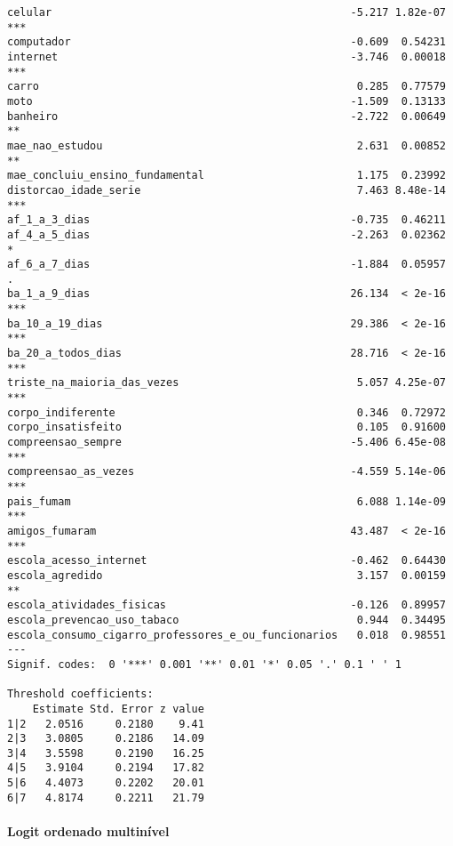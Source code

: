 \documentclass[
]{article}
\let\oldparagraph\paragraph
\renewcommand{\paragraph}[1]{\oldparagraph{#1}\mbox{}}
\begin{document}
\begin{verbatim}
celular                                               -5.217 1.82e-07 ***
computador                                            -0.609  0.54231    
internet                                              -3.746  0.00018 ***
carro                                                  0.285  0.77579    
moto                                                  -1.509  0.13133    
banheiro                                              -2.722  0.00649 ** 
mae_nao_estudou                                        2.631  0.00852 ** 
mae_concluiu_ensino_fundamental                        1.175  0.23992    
distorcao_idade_serie                                  7.463 8.48e-14 ***
af_1_a_3_dias                                         -0.735  0.46211    
af_4_a_5_dias                                         -2.263  0.02362 *  
af_6_a_7_dias                                         -1.884  0.05957 .  
ba_1_a_9_dias                                         26.134  < 2e-16 ***
ba_10_a_19_dias                                       29.386  < 2e-16 ***
ba_20_a_todos_dias                                    28.716  < 2e-16 ***
triste_na_maioria_das_vezes                            5.057 4.25e-07 ***
corpo_indiferente                                      0.346  0.72972    
corpo_insatisfeito                                     0.105  0.91600    
compreensao_sempre                                    -5.406 6.45e-08 ***
compreensao_as_vezes                                  -4.559 5.14e-06 ***
pais_fumam                                             6.088 1.14e-09 ***
amigos_fumaram                                        43.487  < 2e-16 ***
escola_acesso_internet                                -0.462  0.64430    
escola_agredido                                        3.157  0.00159 ** 
escola_atividades_fisicas                             -0.126  0.89957    
escola_prevencao_uso_tabaco                            0.944  0.34495    
escola_consumo_cigarro_professores_e_ou_funcionarios   0.018  0.98551    
---
Signif. codes:  0 '***' 0.001 '**' 0.01 '*' 0.05 '.' 0.1 ' ' 1

Threshold coefficients:
    Estimate Std. Error z value
1|2   2.0516     0.2180    9.41
2|3   3.0805     0.2186   14.09
3|4   3.5598     0.2190   16.25
4|5   3.9104     0.2194   17.82
5|6   4.4073     0.2202   20.01
6|7   4.8174     0.2211   21.79
\end{verbatim}

\hypertarget{logit-ordenado-multinuxedvel}{%
\paragraph{Logit ordenado
multinível}\label{logit-ordenado-multinuxedvel}}
\end{document}

